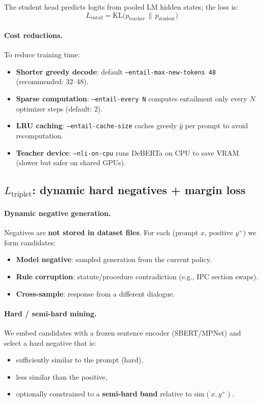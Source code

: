 \documentclass[11pt]{article}
\begin{document}
The student head predicts logits from pooled LM hidden states; the loss is:
\[
L_{\text{entail}} = \text{KL}\big(p_{\text{teacher}} \,\|\, p_{\text{student}}\big)
\]

\paragraph{Cost reductions.}
To reduce training time:
\begin{itemize}
  \item \textbf{Shorter greedy decode}: default \texttt{--entail-max-new-tokens 48} (recommended: 32--48).
  \item \textbf{Sparse computation}: \texttt{--entail-every N} computes entailment only every $N$ optimizer steps (default: 2).
  \item \textbf{LRU caching}: \texttt{--entail-cache-size} caches greedy $\hat{y}$ per prompt to avoid recomputation.
  \item \textbf{Teacher device}: \texttt{--nli-on-cpu} runs DeBERTa on CPU to save VRAM (slower but safer on shared GPUs).
\end{itemize}

\subsection{$L_{\text{triplet}}$: dynamic hard negatives + margin loss}
\paragraph{Dynamic negative generation.}
Negatives are \textbf{not stored in dataset files}. For each (prompt $x$, positive $y^+$) we form candidates:
\begin{itemize}
  \item \textbf{Model negative}: sampled generation from the current policy.
  \item \textbf{Rule corruption}: statute/procedure contradiction (e.g., IPC section swaps).
  \item \textbf{Cross-sample}: response from a different dialogue.
\end{itemize}

\paragraph{Hard / semi-hard mining.}
We embed candidates with a frozen sentence encoder (SBERT/MPNet) and select a hard negative that is:
\begin{itemize}
  \item sufficiently similar to the prompt (hard),
  \item less similar than the positive,
  \item optionally constrained to a \textbf{semi-hard band} relative to $\text{sim}(x,y^+)$.
\end{itemize}
\end{document}
